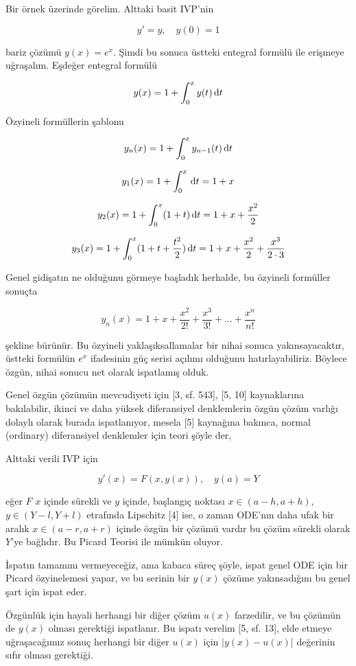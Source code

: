\documentclass[12pt,fleqn]{article}\usepackage{../../common}
\begin{document}
Bir örnek üzerinde görelim. Alttaki basit IVP'nin

$$
y' = y, \quad y(0)=1
$$

bariz çözümü $y(x) = e^x$. Şimdi bu sonuca üstteki entegral formülü ile
erişmeye uğraşalım. Eşdeğer entegral formülü

$$
y(x) = 1 + \int _{0}^{x} y(t) \,\mathrm{d} t
$$

Özyineli formüllerin şablonu

$$
y_n(x) = 1 + \int_{0}^{x} y_{n-1}(t) \,\mathrm{d} t
$$

$$
y_1(x) = 1 + \int_{0}^{x} \,\mathrm{d} t = 1 + x
$$

$$
y_2(x) = 1 + \int_{0}^{x} (1+t) \,\mathrm{d} t = 1 + x + \frac{x^2}{2}
$$

$$
y_3(x) = 1 + \int_{0}^{x} (1 + t + \frac{t^2}{2}) \,\mathrm{d} t =
1 + x + \frac{x^2}{2} + \frac{x^3}{2 \cdot 3}
$$

Genel gidişatın ne olduğunu görmeye başladık herhalde, bu özyineli formüller
sonuçta

$$
y_n(x) = 1 + x + \frac{x^2}{2!} + \frac{x^3}{3!} + ... + \frac{x^n}{n!} 
$$

şekline bürünür. Bu özyineli yaklaşıksallamalar bir nihai sonuca
yakınsayacaktır, üstteki formülün $e^x$ ifadesinin güç serisi açılımı olduğunu
hatırlayabiliriz. Böylece özgün, nihai sonucu net olarak ispatlamış olduk.

Genel özgün çözümün mevcudiyeti için [3, sf. 543], [5, 10] kaynaklarına
bakılabilir, ikinci ve daha yüksek diferansiyel denklemlerin özgün çözüm varlığı
dolaylı olarak burada ispatlanıyor, mesela [5] kaynağına bakınca, normal
(ordinary) diferansiyel denklemler için teori şöyle der,

Alttaki verili IVP için

$$
y'(x) = F(x,y(x)), \quad y(a) = Y
$$

eğer $F$ $x$ içinde sürekli ve $y$ içinde, başlangıç noktası $x \in (a-h,a+h)$,
$y \in (Y-l,Y+l)$ etrafında Lipschitz [4] ise, o zaman ODE'nın daha ufak bir
aralık $x \in (a-r,a+r)$ içinde özgün bir çözümü vardır bu çözüm sürekli olarak
$Y$'ye bağlıdır. Bu Picard Teorisi ile mümkün oluyor.

İspatın tamamını vermeyeceğiz, ama kabaca süreç şöyle, ispat genel ODE için bir
Picard özyinelemesi yapar, ve bu serinin bir $y(x)$ çözüme yakınsadığını bu
genel şart için ispat eder.

Özgünlük için hayali herhangi bir diğer çözüm $u(x)$ farzedilir, ve bu çözümün
de $y(x)$ olması gerektiği ispatlanır. Bu ispatı verelim [5, sf. 13], elde
etmeye uğraşacağımız sonuç herhangi bir diğer $u(x)$ için $|y(x)-u(x)|$
değerinin sıfır olması gerektiği.
\end{document}
